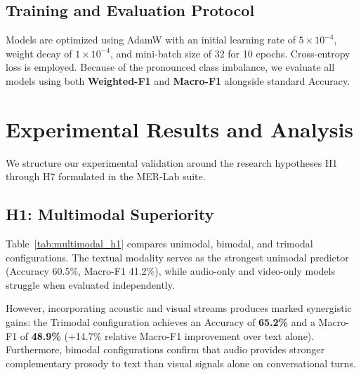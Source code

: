 \documentclass[10pt,twocolumn,letterpaper]{article}
\begin{document}
\subsection{Training and Evaluation Protocol}
Models are optimized using AdamW with an initial learning rate of $5 \times 10^{-4}$, weight decay of $1 \times 10^{-4}$, and mini-batch size of 32 for 10 epochs. Cross-entropy loss is employed. Because of the pronounced class imbalance, we evaluate all models using both \textbf{Weighted-F1} and \textbf{Macro-F1} alongside standard Accuracy.

\section{Experimental Results and Analysis}
\label{sec:results}

We structure our experimental validation around the research hypotheses H1 through H7 formulated in the MER-Lab suite.

\subsection{H1: Multimodal Superiority}
Table~\ref{tab:multimodal_h1} compares unimodal, bimodal, and trimodal configurations. The textual modality serves as the strongest unimodal predictor (Accuracy 60.5\%, Macro-F1 41.2\%), while audio-only and video-only models struggle when evaluated independently.

However, incorporating acoustic and visual streams produces marked synergistic gains: the Trimodal configuration achieves an Accuracy of \textbf{65.2\%} and a Macro-F1 of \textbf{48.9\%} (+14.7\% relative Macro-F1 improvement over text alone). Furthermore, bimodal configurations confirm that audio provides stronger complementary prosody to text than visual signals alone on conversational turns.
\end{document}
